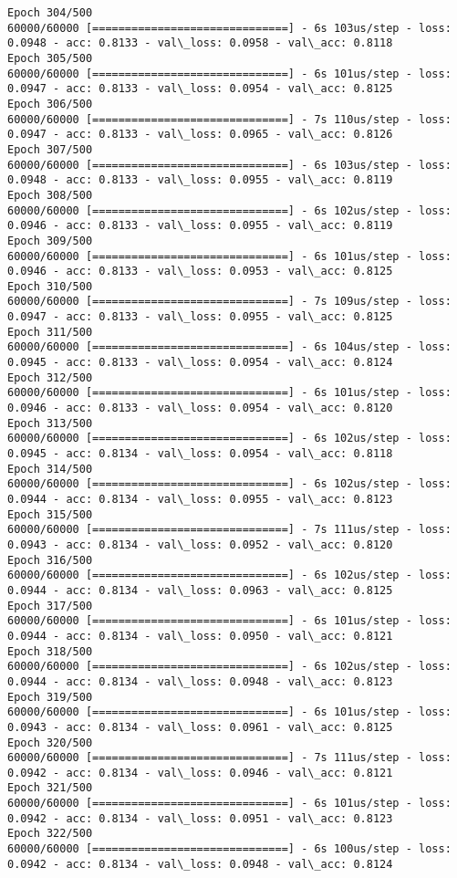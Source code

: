 \documentclass[11pt]{article}
\begin{document}
\begin{Verbatim}[commandchars=\\\{\}]
Epoch 304/500
60000/60000 [==============================] - 6s 103us/step - loss: 0.0948 - acc: 0.8133 - val\_loss: 0.0958 - val\_acc: 0.8118
Epoch 305/500
60000/60000 [==============================] - 6s 101us/step - loss: 0.0947 - acc: 0.8133 - val\_loss: 0.0954 - val\_acc: 0.8125
Epoch 306/500
60000/60000 [==============================] - 7s 110us/step - loss: 0.0947 - acc: 0.8133 - val\_loss: 0.0965 - val\_acc: 0.8126
Epoch 307/500
60000/60000 [==============================] - 6s 103us/step - loss: 0.0948 - acc: 0.8133 - val\_loss: 0.0955 - val\_acc: 0.8119
Epoch 308/500
60000/60000 [==============================] - 6s 102us/step - loss: 0.0946 - acc: 0.8133 - val\_loss: 0.0955 - val\_acc: 0.8119
Epoch 309/500
60000/60000 [==============================] - 6s 101us/step - loss: 0.0946 - acc: 0.8133 - val\_loss: 0.0953 - val\_acc: 0.8125
Epoch 310/500
60000/60000 [==============================] - 7s 109us/step - loss: 0.0947 - acc: 0.8133 - val\_loss: 0.0955 - val\_acc: 0.8125
Epoch 311/500
60000/60000 [==============================] - 6s 104us/step - loss: 0.0945 - acc: 0.8133 - val\_loss: 0.0954 - val\_acc: 0.8124
Epoch 312/500
60000/60000 [==============================] - 6s 101us/step - loss: 0.0946 - acc: 0.8133 - val\_loss: 0.0954 - val\_acc: 0.8120
Epoch 313/500
60000/60000 [==============================] - 6s 102us/step - loss: 0.0945 - acc: 0.8134 - val\_loss: 0.0954 - val\_acc: 0.8118
Epoch 314/500
60000/60000 [==============================] - 6s 102us/step - loss: 0.0944 - acc: 0.8134 - val\_loss: 0.0955 - val\_acc: 0.8123
Epoch 315/500
60000/60000 [==============================] - 7s 111us/step - loss: 0.0943 - acc: 0.8134 - val\_loss: 0.0952 - val\_acc: 0.8120
Epoch 316/500
60000/60000 [==============================] - 6s 102us/step - loss: 0.0944 - acc: 0.8134 - val\_loss: 0.0963 - val\_acc: 0.8125
Epoch 317/500
60000/60000 [==============================] - 6s 101us/step - loss: 0.0944 - acc: 0.8134 - val\_loss: 0.0950 - val\_acc: 0.8121
Epoch 318/500
60000/60000 [==============================] - 6s 102us/step - loss: 0.0944 - acc: 0.8134 - val\_loss: 0.0948 - val\_acc: 0.8123
Epoch 319/500
60000/60000 [==============================] - 6s 101us/step - loss: 0.0943 - acc: 0.8134 - val\_loss: 0.0961 - val\_acc: 0.8125
Epoch 320/500
60000/60000 [==============================] - 7s 111us/step - loss: 0.0942 - acc: 0.8134 - val\_loss: 0.0946 - val\_acc: 0.8121
Epoch 321/500
60000/60000 [==============================] - 6s 101us/step - loss: 0.0942 - acc: 0.8134 - val\_loss: 0.0951 - val\_acc: 0.8123
Epoch 322/500
60000/60000 [==============================] - 6s 100us/step - loss: 0.0942 - acc: 0.8134 - val\_loss: 0.0948 - val\_acc: 0.8124

\end{Verbatim}
\end{document}
